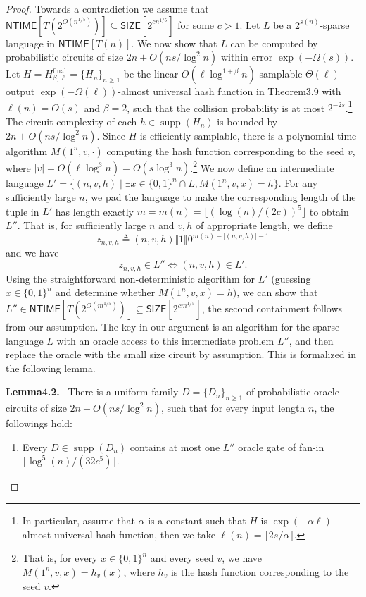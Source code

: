 \documentclass[10pt,a4paper]{article}
\newenvironment{authorclaim}[1]{\par\medskip\noindent\textbf{#1.}\ }{\par\medskip}
\begin{document}
\begin{proof}
Towards a contradiction we assume that $\mathsf{NTIME}[T(2^{O(n^{1/5})})]\subseteq\mathsf{SIZE}[2^{cn^{1/5}}]$ for some $c>1$. Let $L$ be a $2^{s(n)}$-sparse language in $\mathsf{NTIME}[T(n)]$. We now show that $L$ can be computed by probabilistic circuits of size $2n+O(ns/\log^2n)$ within error $\exp(-\Omega(s))$.
Let $H=H^{\mathrm{final}}_{\beta,\ell}=\{H_n\}_{n\ge1}$ be the linear $O(\ell\log^{1+\beta}n)$-samplable $\Theta(\ell)$-output $\exp(-\Omega(\ell))$-almost universal hash function in Theorem3.9 with $\ell(n)=O(s)$ and $\beta=2$, such that the collision probability is at most $2^{-2s}$.\footnote{In particular, assume that $\alpha$ is a constant such that $H$ is $\exp(-\alpha\ell)$-almost universal hash function, then we take $\ell(n)=\lceil2s/\alpha\rceil$.} The circuit complexity of each $h\in\operatorname{supp}(H_n)$ is bounded by $2n+O(ns/\log^2n)$. Since $H$ is efficiently samplable, there is a polynomial time algorithm $M(1^n,v,\cdot)$ computing the hash function corresponding to the seed $v$, where $|v|=O(\ell\log^3n)=O(s\log^3n)$.\footnote{That is, for every $x\in\{0,1\}^n$ and every seed $v$, we have $M(1^n,v,x)=h_v(x)$, where $h_v$ is the hash function corresponding to the seed $v$.}
We now define an intermediate language $L'=\{(n,v,h)\mid\exists x\in\{0,1\}^n\cap L,M(1^n,v,x)=h\}$. For any sufficiently large $n$, we pad the language to make the corresponding length of the tuple in $L'$ has length exactly $m=m(n)=\lfloor(\log(n)/(2c))^5\rfloor$ to obtain $L''$. That is, for sufficiently large $n$ and $v,h$ of appropriate length, we define
\[z_{n,v,h}\triangleq(n,v,h)\Vert1\Vert0^{m(n)-|(n,v,h)|-1}\]
and we have
\[z_{n,v,h}\in L''\Longleftrightarrow(n,v,h)\in L'.\]
Using the straightforward non-deterministic algorithm for $L'$ (guessing $x\in\{0,1\}^n$ and determine whether $M(1^n,v,x)=h$), we can show that $L''\in\mathsf{NTIME}[T(2^{O(m^{1/5})})]\subseteq\mathsf{SIZE}[2^{cm^{1/5}}]$, the second containment follows from our assumption.
The key in our argument is an algorithm for the sparse language $L$ with an oracle access to this intermediate problem $L''$, and then replace the oracle with the small size circuit by assumption. This is formalized in the following lemma.
\begin{authorclaim}{Lemma4.2}
There is a uniform family $D=\{D_n\}_{n\ge1}$ of probabilistic oracle circuits of size $2n+O(ns/\log^2n)$, such that for every input length $n$, the followings hold:
\begin{enumerate}
\item Every $D\in\operatorname{supp}(D_n)$ contains at most one $L''$ oracle gate of fan-in $\lfloor\log^5(n)/(32c^5)\rfloor$.

\end{enumerate}
\end{authorclaim}
\end{proof}
\end{document}
